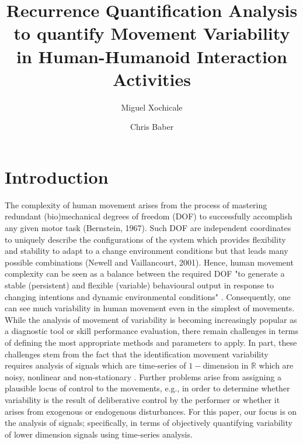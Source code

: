 \documentclass[fleqn,10pt]{wlscirep}
\title{Recurrence Quantification Analysis to quantify Movement Variability in Human-Humanoid Interaction Activities}
\author[1,*]{Miguel Xochicale}
\author{Chris Baber}
\affil[1]{University of Birmingham,
	School of Computer Science,
	Birmingham, 
	B15 2TT, 
	UK}
\affil[*]{perez.xochicale@gmail.com}
\begin{document}
\flushbottom
\maketitle
\thispagestyle{empty}

\section*{Introduction}
The complexity of human movement arises from the process of mastering redundant (bio)mechanical degrees of freedom (DOF) to successfully accomplish any given motor task (Bernstein, 1967).
Such DOF are independent coordinates to uniquely describe the configurations of the system which provides flexibility and stability to adapt to a change environment conditions but that leads many possible combinations (Newell and Vaillancourt, 2001).
Hence, human movement complexity can be seen as a balance between the required DOF "to generate a stable (persistent) and flexible (variable) behavioural output in response to changing intentions and dynamic environmental conditions" \cite{davids2003}.
Consequently, one can see much variability in human movement even in the simplest of movements.
While the analysis of movement of variability is becoming increasingly popular as a diagnostic tool or skill performance evaluation, there remain challenges in terms of defining the most appropriate methods and parameters to apply.
In part, these challenges stem from the fact that the identification movement variability requires analysis of signals which are time-series of $1-$dimension in $\mathbb{R}$ which are noisy, nonlinear and non-stationary \cite{gomezgarcia2014}.
Further problems arise from assigning a plausible locus of control to the movements, e.g., in order to determine whether variability is the result of deliberative control by the performer or whether it arises from exogenous or endogenous disturbances.
For this paper, our focus is on the analysis of signals; specifically, in terms of objectively quantifying variability of lower dimension signals using time-series analysis.
\end{document}
